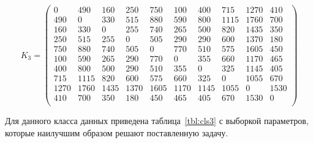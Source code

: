 \begin{equation}
	\label{eqт:kd3}
	K_{3} = \begin{pmatrix}
		0 & 490 & 160 & 250 & 750 & 100 & 400 & 715 & 1270 & 410 \\
		490 & 0 & 330 & 515 & 880 & 590 & 800 & 1115 & 1760 & 700 \\
		160 & 330 & 0 & 255 & 740 & 265 & 500 & 820 & 1435 & 350 \\
		250 & 515 & 255 & 0 & 505 & 290 & 290 & 600 & 1370 & 180 \\
		750 & 880 & 740 & 505 & 0 & 770 & 510 & 575 & 1605 & 450 \\
		100 & 590 & 265 & 290 & 770 & 0 & 355 & 660 & 1170 & 465 \\
		400 & 800 & 500 & 290 & 510 & 355 & 0 & 325 & 1145 & 405 \\
		715 & 1115 & 820 & 600 & 575 & 660 & 325 & 0 & 1055 & 670 \\
		1270 & 1760 & 1435 & 1370 & 1605 & 1170 & 1145 & 1055 & 0 & 1530 \\
		410 & 700 & 350 & 180 & 450 & 465 & 405 & 670 & 1530 & 0 \\
	\end{pmatrix}
\end{equation}

Для данного класса данных приведена таблица~\ref{tbl:cls3} с выборкой параметров, которые наилучшим образом решают поставленную задачу.

